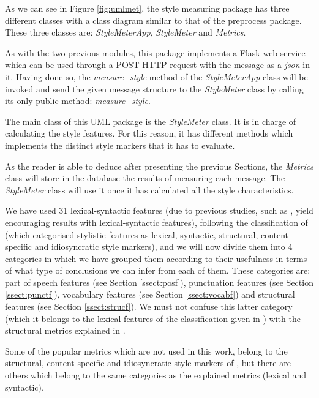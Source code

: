 As we can see in Figure \ref{fig:umlmet}, the style measuring package has three different classes with a class diagram similar to that of the preprocess package. These three classes are: \textit{StyleMeterApp}, \textit{StyleMeter} and \textit{Metrics}.

As with the two previous modules, this package implements a Flask web service which can be used through a POST HTTP request with the message as a \textit{json} in it. Having done so, the \textit{measure\_style} method of the \textit{StyleMeterApp} class will be invoked and send the given message structure to the \textit{StyleMeter} class by calling its only public method: \textit{measure\_style}.

The main class of this UML package is the \textit{StyleMeter} class. It is in charge of calculating the style features. For this reason, it has different methods which implements the distinct style markers that it has to evaluate.

As the reader is able to deduce after presenting the previous Sections, the \textit{Metrics} class will store in the database the results of measuring each message. The \textit{StyleMeter} class will use it once it has calculated all the style characteristics.

We have used 31 lexical-syntactic features (due to previous studies, such as \cite{homem2011authorship}, yield encouraging results with lexical-syntactic features), following the classification of \cite{abbasi2008writeprints} (which categorised stylistic features as lexical, syntactic, structural, content-specific and idiosyncratic style markers), and we will now divide them into 4 categories in which we have grouped them according to their usefulness in terms of what type of conclusions we can infer from each of them. These categories are: part of speech features (see Section \ref{ssect:posf}), punctuation features (see Section \ref{ssect:punctf}), vocabulary features (see Section \ref{ssect:vocabf}) and structural features (see Section \ref{ssect:strucf}). We must not confuse this latter category (which it belongs to the lexical features of the classification given in \cite{abbasi2008writeprints}) with the structural metrics explained in \cite{abbasi2008writeprints}.

Some of the popular metrics which are not used in this work, belong to the structural, content-specific and idiosyncratic style markers of \cite{abbasi2008writeprints}, but there are others which belong to the same categories as the explained metrics (lexical and syntactic).

